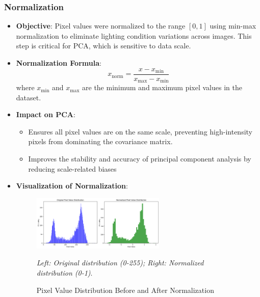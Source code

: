 \documentclass{article}
\begin{document}
	\subsubsection{Normalization}
	\begin{itemize}
		\item \textbf{Objective}: Pixel values were normalized to the range \([0, 1]\) using min-max normalization to eliminate lighting condition variations across images. This step is critical for PCA, which is sensitive to data scale.
		
		\item \textbf{Normalization Formula}:
		\[
		x_{\text{norm}} = \frac{x - x_{\text{min}}}{x_{\text{max}} - x_{\text{min}}}
		\]
		where \(x_{\text{min}}\) and \(x_{\text{max}}\) are the minimum and maximum pixel values in the dataset.
		
		\item \textbf{Impact on PCA}:
		\begin{itemize}
			\item Ensures all pixel values are on the same scale, preventing high-intensity pixels from dominating the covariance matrix.
			\item Improves the stability and accuracy of principal component analysis by reducing scale-related biases
		\end{itemize}
		
		\item \textbf{Visualization of Normalization}:
		\begin{figure}[h!]
			\centering
			\includegraphics[width=0.6\textwidth]{Normalized Pixel Value Distribution.png}
			\caption{Pixel Value Distribution Before and After Normalization}
			\label{fig:normalization_comparison}
			\vspace{6pt} %
			\small \textit{Left: Original distribution (0-255); Right: Normalized distribution (0-1)}.
		\end{figure}
	\end{itemize}
	
\end{document}
